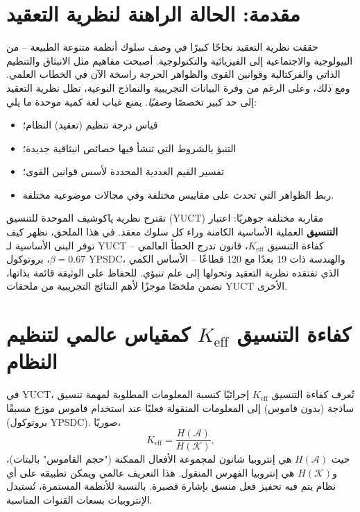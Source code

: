 \documentclass[11pt,a4paper]{article}
\theoremstyle{remark}
\newcommand{\Keff}{K_{\mathrm{eff}}}
\begin{document}
	\tableofcontents
	\newpage
	
	\section{مقدمة: الحالة الراهنة لنظرية التعقيد}
	\label{sec:intro}
	
	حققت نظرية التعقيد نجاحًا كبيرًا في وصف سلوك أنظمة متنوعة الطبيعة – من البيولوجية والاجتماعية إلى الفيزيائية والتكنولوجية. أصبحت مفاهيم مثل الانبثاق والتنظيم الذاتي والفركتالية وقوانين القوى والظواهر الحرجة راسخة الآن في الخطاب العلمي. ومع ذلك، وعلى الرغم من وفرة البيانات التجريبية والنماذج النوعية، تظل نظرية التعقيد إلى حد كبير تخصصًا \emph{وصفيًا}. يمنع غياب لغة كمية موحدة ما يلي:
	\begin{itemize}
		\item قياس درجة تنظيم (تعقيد) النظام؛
		\item التنبؤ بالشروط التي تنشأ فيها خصائص انبثاقية جديدة؛
		\item تفسير القيم العددية المحددة لأسس قوانين القوى؛
		\item ربط الظواهر التي تحدث على مقاييس مختلفة وفي مجالات موضوعية مختلفة.
	\end{itemize}
	
	تقترح نظرية ياكوشيف الموحدة للتنسيق (YUCT) مقاربة مختلفة جوهريًا: اعتبار \textbf{التنسيق} العملية الأساسية الكامنة وراء كل سلوك معقد. في هذا الملحق، نظهر كيف توفر البنى الأساسية لـ YUCT – كفاءة التنسيق \(\Keff\)، قانون تدرج الخطأ العالمي \(\beta = 0.67\)، بروتوكول YPSDC، والهندسة ذات 19 بعدًا مع 120 قطاعًا – الأساس الكمي الذي تفتقده نظرية التعقيد وتحولها إلى علم تنبؤي. للحفاظ على الوثيقة قائمة بذاتها، نضمن ملخصًا موجزًا لأهم النتائج التجريبية من ملحقات YUCT الأخرى.
	
	\section{كفاءة التنسيق \texorpdfstring{\(\Keff\)}{Keff} كمقياس عالمي لتنظيم النظام}
	\label{sec:keff}
	
	في YUCT، تُعرف كفاءة التنسيق \(\Keff\) إجرائيًا كنسبة المعلومات المطلوبة لمهمة تنسيق ساذجة (بدون قاموس) إلى المعلومات المنقولة فعليًا عند استخدام قاموس موزع مسبقًا (بروتوكول YPSDC). صوريًا،
	\begin{equation}
		\Keff = \frac{H(\mathcal{A})}{H(\mathcal{K})},
	\end{equation}
	حيث \(H(\mathcal{A})\) هي إنتروبيا شانون لمجموعة الأفعال الممكنة ("حجم القاموس" بالبتات)، و\(H(\mathcal{K})\) هي إنتروبيا الفهرس المنقول. هذا التعريف عالمي ويمكن تطبيقه على أي نظام يتم فيه تحفيز فعل منسق بإشارة قصيرة. بالنسبة للأنظمة المستمرة، تُستبدل الإنتروبيات بسعات القنوات المناسبة.
	
\end{document}
